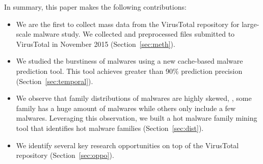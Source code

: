 %


In summary, this paper makes the following contributions:

\begin{itemize}

\item We are the first to collect mass data from the VirusTotal repository for large-scale malware study.
We collected and preprocessed files submitted to VirusTotal in November 2015 (Section~\ref{sec:meth}).

\item We studied the burstiness of malwares using a new 
cache-based malware prediction tool.
This tool achieves greater than 90\% prediction precision (Section~\ref{sec:temporal}). 

\item We observe that family distributions of malwares are highly skewed, 
\ie, some family has a huge amount of malwares while others only include a few malwares. 
Leveraging this observation, we built a hot malware family mining tool that identifies hot 
malware families (Section~\ref{sec:dist}).

\item We identify several key research opportunities on top of the VirusTotal repository (Section~\ref{sec:oppo}). 

\end{itemize}


